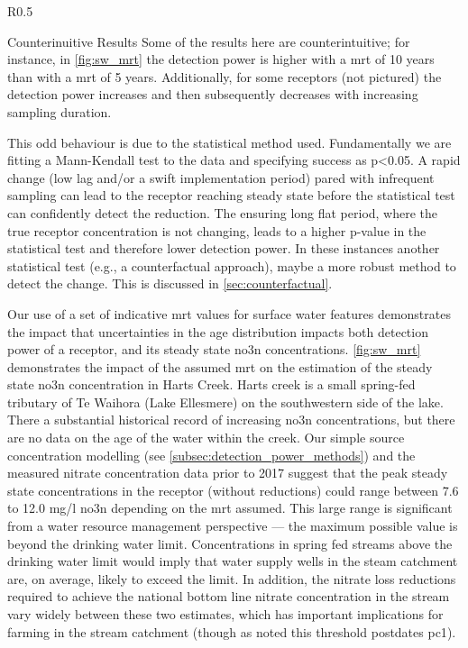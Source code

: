 \begin{wrapfigure}{R}{0.5\textwidth}
    \begin{breakawaybox}[
        label={box:wierdresults}]{Counterinuitive Results}
        Some of the results here are counterintuitive; for instance, in \autoref{fig:sw_mrt} the detection power is higher with a \gls{mrt} of 10 years than with a \gls{mrt} of 5 years. Additionally, for some receptors (not pictured) the detection power increases and then subsequently decreases with increasing sampling duration.

        This odd behaviour is due to the statistical method used. Fundamentally we are fitting a Mann-Kendall test to the data and specifying success as p<0.05. A rapid change (low lag and/or a swift implementation period) pared with infrequent sampling can lead to the receptor reaching steady state before the statistical test can confidently detect the reduction. The ensuring long flat period, where the true receptor concentration is not changing, leads to a higher p-value in the statistical test and therefore lower detection power. In these instances another statistical test (e.g., a counterfactual approach), maybe a more robust method to detect the change. This is discussed in \autoref{sec:counterfactual}.
    \end{breakawaybox}
\end{wrapfigure}

Our use of a set of indicative \gls{mrt} values for surface water features demonstrates the impact that uncertainties in the age distribution impacts both detection power of a receptor, and its steady state \gls{no3n} concentrations.
\autoref{fig:sw_mrt} demonstrates the impact of the assumed \gls{mrt} on the estimation of the steady state \gls{no3n} concentration in Harts Creek.
Harts creek is a small spring-fed tributary of Te Waihora (Lake Ellesmere) on the southwestern side of the lake.
There a substantial historical record of increasing \gls{no3n} concentrations, but there are no data on the age of the water within the creek.
Our simple source concentration modelling (see \autoref{subsec:detection_power_methods}) and the measured nitrate concentration data prior to 2017 suggest that the peak steady state concentrations in the receptor (without reductions) could range between 7.6 to 12.0 mg/l \gls{no3n} depending on the \gls{mrt} assumed.
This large range is significant from a water resource management perspective --- the maximum possible value is beyond the drinking water limit.
Concentrations in spring fed streams above the drinking water limit would imply that water supply wells in the steam catchment are, on average, likely to exceed the limit.
In addition, the nitrate loss reductions required to achieve the national bottom line nitrate concentration in the stream vary widely between these two estimates, which has important implications for farming in the stream catchment (though as noted this threshold postdates \gls{pc1}).

